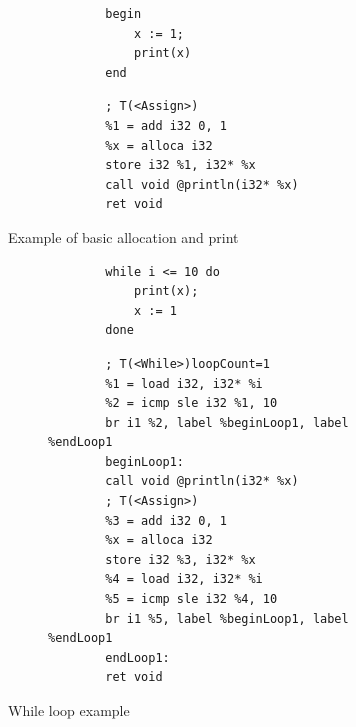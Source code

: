 \documentclass[letterpaper]{article}
\begin{document}
\begin{figure}[H]
    \begin{subfigure}{.5\textwidth}
        \begin{lstlisting}
        begin
            x := 1;
            print(x)
        end
        \end{lstlisting}
    \end{subfigure}
    \begin{subfigure}{.5\textwidth}
        \begin{lstlisting}
        ; T(<Assign>)
    	%1 = add i32 0, 1
    	%x = alloca i32
    	store i32 %1, i32* %x
        call void @println(i32* %x)
    	ret void
        \end{lstlisting}
    \end{subfigure}
    \caption{Example of basic allocation and print}
\end{figure}


\begin{figure}[H]
    \begin{subfigure}{.5\textwidth}
        \begin{lstlisting}
        while i <= 10 do
            print(x);
            x := 1
        done
        \end{lstlisting}
    \end{subfigure}
    \begin{subfigure}{.5\textwidth}
        \begin{lstlisting}
        ; T(<While>)loopCount=1
    	%1 = load i32, i32* %i
    	%2 = icmp sle i32 %1, 10
    	br i1 %2, label %beginLoop1, label %endLoop1
    	beginLoop1:
    	call void @println(i32* %x)
    	; T(<Assign>)
    	%3 = add i32 0, 1
    	%x = alloca i32
    	store i32 %3, i32* %x
    	%4 = load i32, i32* %i
    	%5 = icmp sle i32 %4, 10
    	br i1 %5, label %beginLoop1, label %endLoop1
    	endLoop1:
    	ret void
        \end{lstlisting}
    \end{subfigure}
     \caption{While loop example}
\end{figure}
\end{document}
